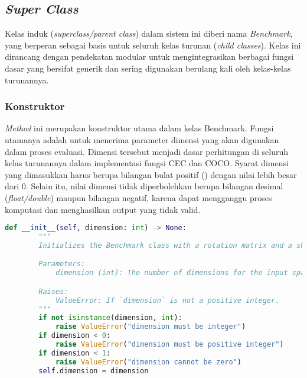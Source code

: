 \subsection{\textit{Super Class}}
Kelas induk (\textit{superclass/parent class}) dalam sistem ini diberi nama \textit{Benchmark}, yang berperan sebagai basis untuk seluruh kelas turunan (\textit{child classes}). Kelas ini dirancang dengan pendekatan modular untuk mengintegrasikan berbagai fungsi dasar yang bersifat generik dan sering digunakan berulang kali oleh kelas-kelas turunannya.\\
\subsubsection{Konstruktor}
\textit{Method} ini merupakan konstruktor utama dalam kelas Benchmark. Fungsi utamanya adalah untuk menerima parameter dimensi yang akan digunakan dalam proses evaluasi. Dimensi tersebut menjadi dasar perhitungan di seluruh kelas turunannya dalam implementasi fungsi CEC dan COCO. Syarat dimensi yang dimasukkan harus berupa bilangan bulat positif () dengan nilai lebih besar dari 0. Selain itu, nilai dimensi tidak diperbolehkan berupa bilangan desimal (\textit{float/double}) maupun bilangan negatif, karena dapat mengganggu proses komputasi dan menghasilkan output yang tidak valid.
\begin{lstlisting}[language=Python, caption=kontruktor kelas benchmark, label=lst:init_benchmark]
    def __init__(self, dimension: int) -> None:
        """
        Initializes the Benchmark class with a rotation matrix and a shift vector.

        Parameters:
            dimension (int): The number of dimensions for the input space. Must be a positive integer.

        Raises:
            ValueError: If `dimension` is not a positive integer.
        """
        if not isinstance(dimension, int):
            raise ValueError("dimension must be integer")
        if dimension < 0:
            raise ValueError("dimension must be positive integer")
        if dimension < 1:
            raise ValueError("dimension cannot be zero")
        self.dimension = dimension
\end{lstlisting}
